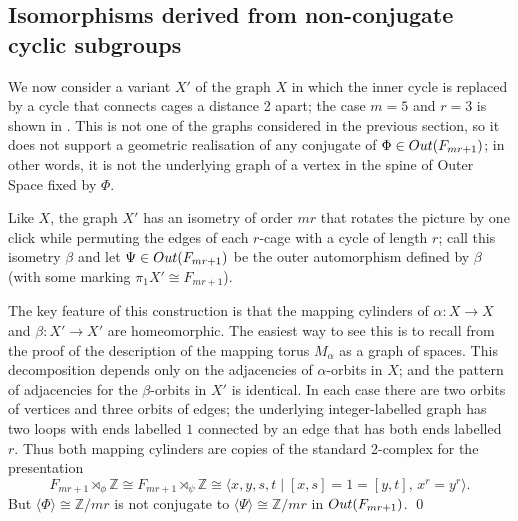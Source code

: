 \documentclass[11pt, a4 paper]{amsart}
\numberwithin{equation}{section}
\theoremstyle{remark}
\theoremstyle{definition}
\def\Z{\mathbb Z}
\def\<{\langle}
\def\>{\rangle}
\begin{document}
\subsection{
	Isomorphisms derived from non-conjugate cyclic subgroups}

We now consider a variant $X'$ of the graph $X$ 
in which the inner cycle is replaced 
by a cycle that connects cages a distance 2 apart; 
the case $m=5$ and $r=3$ is shown in . 
This is not one of the graphs 
considered in the previous section,
so it does not support a geometric realisation 
of any conjugate of $\Phi\in {\rm{Out}}(F_{mr+1})$; 
in other words, 
it is not the underlying graph 
of a vertex in the spine of Outer Space fixed by $\Phi$. 

Like $X$, the graph $X'$ has an isometry of order $mr$ 
that rotates the picture by one click 
while permuting the edges of each $r$-cage 
with a cycle of length $r$; 
call this isometry $\beta$ 
and let $\Psi\in {\rm{Out}}(F_{mr+1})$ be 
the outer automorphism defined by $\beta$ 
(with some marking $\pi_1X'\cong F_{mr+1}$). 

The key feature of this construction is 
that the mapping cylinders of 
${\alpha : X\to X}$ and $\beta: X'\to X'$ are homeomorphic. 
The easiest way to see this 
is to recall from the proof of  
the description of the mapping torus $M_\alpha$ 
as a graph of spaces. 
This decomposition depends only 
on the adjacencies of $\alpha$-orbits in $X$; 
and the pattern of adjacencies for the $\beta$-orbits in $X'$ 
is identical. 
In each case there are two orbits of vertices 
and three orbits of edges; 
the underlying integer-labelled graph 
has two loops with ends labelled $1$ 
connected by an edge that has both ends labelled $r$. 
Thus both mapping cylinders 
are copies of the standard 2-complex for the presentation 
$$
	F_{mr+1}\rtimes_\phi\Z\cong F_{mr+1}\rtimes_\psi\Z \cong 
	\< x,y,s,t \mid [x,s]=1=[y,t],\, x^{r}=y^{r}\>.
$$
But $\<\Phi\>\cong\Z/mr$ 
is not conjugate to $\<\Psi\>\cong\Z/mr$ 
in ${\rm{Out}}(F_{mr+1})$. \qed
\end{document}

